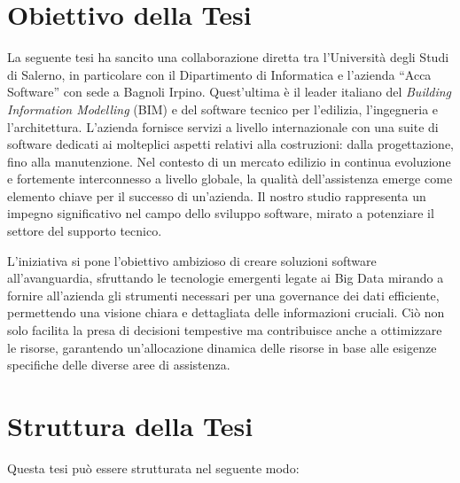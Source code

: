 \section{Obiettivo della Tesi}
La seguente tesi ha sancito una collaborazione diretta tra l'Università degli Studi di Salerno, in particolare con il Dipartimento di Informatica e l'azienda ``Acca Software'' con sede a Bagnoli Irpino. Quest'ultima è il leader italiano del \textit{Building Information Modelling} (BIM) e del software tecnico per l'edilizia, l'ingegneria e l'architettura. L'azienda fornisce servizi a livello internazionale con una suite di software dedicati ai molteplici aspetti relativi alla costruzioni: dalla progettazione, fino alla manutenzione. Nel contesto di un mercato edilizio in continua evoluzione e fortemente interconnesso a livello globale, la qualità dell'assistenza emerge come elemento chiave per il successo di un'azienda. Il nostro studio rappresenta un impegno significativo nel campo dello sviluppo software, mirato a potenziare il settore del supporto tecnico.

L'iniziativa si pone l'obiettivo ambizioso di creare soluzioni software all'avanguardia, sfruttando le tecnologie emergenti legate ai Big Data mirando a fornire all'azienda gli strumenti necessari per una governance dei dati efficiente, permettendo una visione chiara e dettagliata delle informazioni cruciali. Ciò non solo facilita la presa di decisioni tempestive ma contribuisce anche a ottimizzare le risorse, garantendo un'allocazione dinamica delle risorse in base alle esigenze specifiche delle diverse aree di assistenza.

\section{Struttura della Tesi}
Questa tesi può essere strutturata nel seguente modo:

